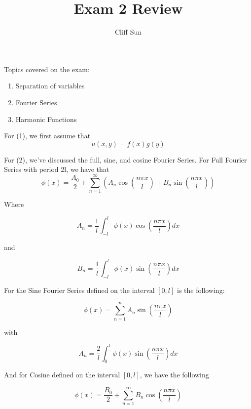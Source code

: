 \documentclass{article}
\title{Exam 2 Review}
\author{Cliff Sun}
\begin{document}
\maketitle

Topics covered on the exam:

\begin{enumerate}
    \item Separation of variables
    \item Fourier Series
    \item Harmonic Functions
\end{enumerate}

For (1), we first assume that 
\begin{equation}
    u(x,y) = f(x)g(y)
\end{equation}


For (2), we've discussed the full, sine, and cosine Fourier Series. For Full Fourier Series with period 2l, we have that
\begin{equation}
    \phi(x) = \frac{A_0}{2} + \sum_{n=1}^{\infty}(A_n\cos(\frac{n\pi x}{l}) + B_n\sin(\frac{n\pi x}{l}))
\end{equation}

Where 

\begin{equation}
    A_n = \frac{1}{l}\int_{-l}^{l}\phi(x)\cos(\frac{n\pi x}{l})dx
\end{equation}

and

\begin{equation}
    B_n = \frac{1}{l}\int_{-l}^{l}\phi(x)\sin(\frac{n\pi x}{l})dx
\end{equation}

For the Sine Fourier Series defined on the interval $[0,l]$ is the following:

\begin{equation}
    \phi(x) = \sum_{n=1}^{\infty}A_n\sin(\frac{n\pi x}{l})
\end{equation}

with

\begin{equation}
    A_n = \frac{2}{l}\int_{0}^{l}\phi(x)\sin(\frac{n\pi x}{l})dx
\end{equation}

And for Cosine defined on the interval $[0,l]$, we have the following

\begin{equation}
    \phi(x) = \frac{B_0}{2} + \sum_{n=1}^{\infty}B_n\cos(\frac{n\pi x}{l})
\end{equation}
\end{document}
